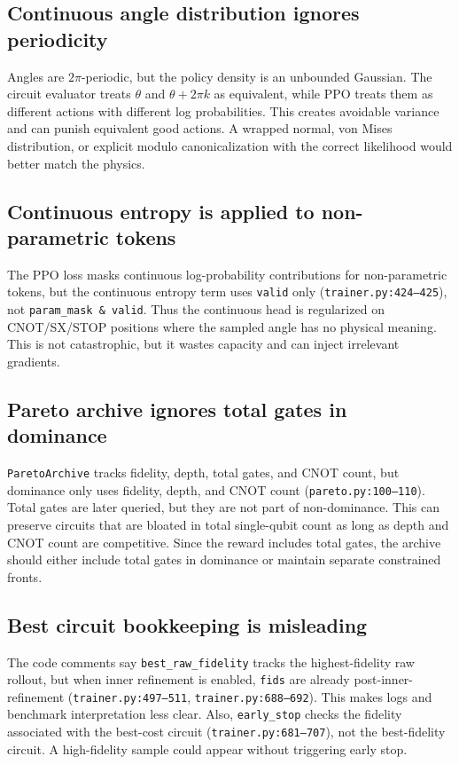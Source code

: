 \documentclass[11pt,a4paper]{article}
\begin{document}
\subsection{Continuous angle distribution ignores periodicity}

Angles are $2\pi$-periodic, but the policy density is an unbounded Gaussian.
The circuit evaluator treats $\theta$ and $\theta+2\pi k$ as equivalent, while
PPO treats them as different actions with different log probabilities. This
creates avoidable variance and can punish equivalent good actions. A wrapped
normal, von Mises distribution, or explicit modulo canonicalization with the
correct likelihood would better match the physics.

\subsection{Continuous entropy is applied to non-parametric tokens}

The PPO loss masks continuous log-probability contributions for non-parametric
tokens, but the continuous entropy term uses \texttt{valid} only
(\texttt{trainer.py:424--425}), not \texttt{param\_mask \& valid}. Thus the
continuous head is regularized on CNOT/SX/STOP positions where the sampled
angle has no physical meaning. This is not catastrophic, but it wastes
capacity and can inject irrelevant gradients.

\subsection{Pareto archive ignores total gates in dominance}

\texttt{ParetoArchive} tracks fidelity, depth, total gates, and CNOT count, but
dominance only uses fidelity, depth, and CNOT count
(\texttt{pareto.py:100--110}). Total gates are later queried, but they are not
part of non-dominance. This can preserve circuits that are bloated in total
single-qubit count as long as depth and CNOT count are competitive. Since the
reward includes total gates, the archive should either include total gates in
dominance or maintain separate constrained fronts.

\subsection{Best circuit bookkeeping is misleading}

The code comments say \texttt{best\_raw\_fidelity} tracks the highest-fidelity
raw rollout, but when inner refinement is enabled, \texttt{fids} are already
post-inner-refinement (\texttt{trainer.py:497--511}, \texttt{trainer.py:688--692}).
This makes logs and benchmark interpretation less clear. Also,
\texttt{early\_stop} checks the fidelity associated with the best-cost circuit
(\texttt{trainer.py:681--707}), not the best-fidelity circuit. A high-fidelity
sample could appear without triggering early stop.
\end{document}
